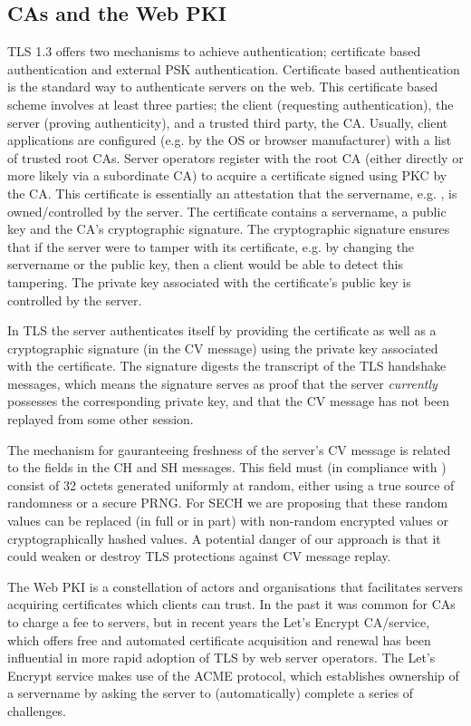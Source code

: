 \subsection{CAs and the Web PKI}
\ac{TLS} 1.3 offers two mechanisms to achieve authentication;
certificate based authentication and external \ac{PSK} authentication.
Certificate based authentication is the standard way
to authenticate servers on the web.
This certificate based scheme involves at least three parties; the client
(requesting authentication), the server (proving authenticity),
and a trusted third party, the \ac{CA}.
Usually, client applications are configured (e.g. by the \ac{OS} or browser
manufacturer) with a list of trusted root \ac{CA}s.
Server operators register with the root \ac{CA}
(either directly or more likely via a subordinate \ac{CA})
to acquire a certificate
signed using \ac{PKC} by the \ac{CA}.
This certificate is essentially an attestation that
the servername, e.g. , is owned/controlled by the server.
The certificate contains a servername, a public key
and the \ac{CA}'s cryptographic signature.
The cryptographic signature ensures that if the server
were to tamper with its certificate, e.g. by changing the servername or the public
key,
then a client would be able to detect this tampering.
The private key associated with the certificate's public key is controlled by the server.

In \ac{TLS} the server authenticates itself by providing the certificate
as well as a cryptographic signature (in the \ac{CV} message) using the private key associated with the certificate. The signature digests the transcript of the \ac{TLS} handshake messages, which means the signature serves as proof that the server {\em currently}
possesses the corresponding private key,
and that the \ac{CV} message has not been replayed from some other session.

The mechanism for gauranteeing freshness of the server's \ac{CV} message is related to the  fields in the \ac{CH} and \ac{SH} messages.
This field must (in compliance with \cite{rfc8446}) consist of 32 octets generated
uniformly at random,
either using a true source of randomness or a secure \ac{PRNG}.
For \ac{SECH} we are proposing that these random values
can be replaced (in full or in part) with non-random
encrypted values or cryptographically hashed values.
A potential danger of our approach is that it could weaken
or destroy \ac{TLS} protections against \ac{CV} message replay.

The Web \ac{PKI} is a constellation of actors
and organisations that facilitates
servers acquiring certificates
which clients can trust.
In the past it was common for \ac{CA}s to charge a fee to servers,
but in recent years the Let's Encrypt \ac{CA}/service,
which offers free and automated certificate acquisition and renewal
has been influential in more rapid adoption of \ac{TLS} by
web server operators.
The Let's Encrypt service makes use of the \ac{ACME} protocol,
which establishes ownership of a servername by
asking the server to (automatically) complete a series of challenges.

